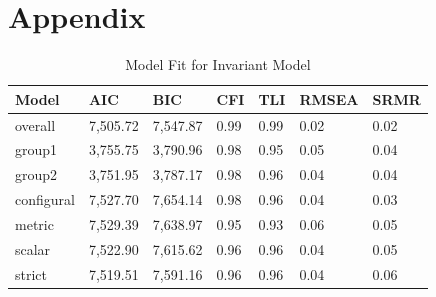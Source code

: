 \documentclass[
  man]{apa6}
\begin{document}
\hypertarget{appendix}{%
\section{Appendix}\label{appendix}}

\begin{table}[tbp]

\begin{center}
\begin{threeparttable}

\caption{\label{tab:unnamed-chunk-1}Model Fit for Invariant Model}

\begin{tabular}{lllllll}
\toprule
Model & AIC & BIC & CFI & TLI & RMSEA & SRMR\\
\midrule
overall & 7,505.72 & 7,547.87 & 0.99 & 0.99 & 0.02 & 0.02\\
group1 & 3,755.75 & 3,790.96 & 0.98 & 0.95 & 0.05 & 0.04\\
group2 & 3,751.95 & 3,787.17 & 0.98 & 0.96 & 0.04 & 0.04\\
configural & 7,527.70 & 7,654.14 & 0.98 & 0.96 & 0.04 & 0.03\\
metric & 7,529.39 & 7,638.97 & 0.95 & 0.93 & 0.06 & 0.05\\
scalar & 7,522.90 & 7,615.62 & 0.96 & 0.96 & 0.04 & 0.05\\
strict & 7,519.51 & 7,591.16 & 0.96 & 0.96 & 0.04 & 0.06\\
\bottomrule
\end{tabular}

\end{threeparttable}
\end{center}

\end{table}
\end{document}
